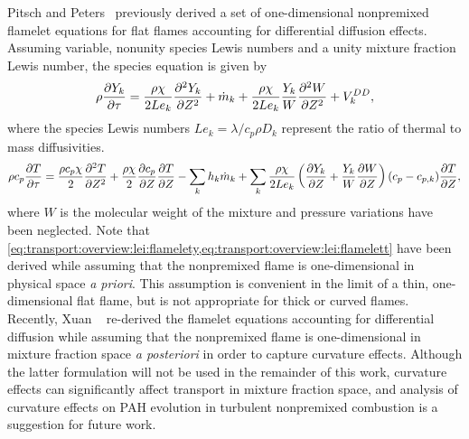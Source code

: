 Pitsch and Peters~\cite{pitsch1998} previously derived a set of one-dimensional nonpremixed flamelet equations for flat flames accounting for differential diffusion effects. Assuming variable, nonunity species Lewis numbers and a unity mixture fraction Lewis number, the species equation is given by
\begin{equation}\label{eq:transport:overview:lei:flamelety}
  \rho\pder[Y_k]{\tau} = \frac{\rho\chi}{2 Le_k}\sder[Y_k]{Z} + \dot{m}_k + \frac{\rho\chi}{2 Le_k}\frac{Y_k}{W}\sder[W]{Z} + V_k^{DD},
\end{equation}
where the species Lewis numbers $Le_k = \lambda/c_p\rho D_k$ represent the ratio of thermal to mass diffusivities.
\begin{equation}\label{eq:transport:overview:lei:flamelett}
  \rho c_p \pder[T]{\tau} = \frac{\rho c_p \chi}{2}\sder[T]{Z} + \frac{\rho\chi}{2}\pder[c_p]{Z}\pder[T]{Z} - \sum\limits_{k} h_k\dot{m}_k + \sum\limits_{k} \frac{\rho\chi}{2 Le_k}\left( \pder[Y_k]{Z} + \frac{Y_k}{W}\pder[W]{Z} \right)(c_p - c_{p,k})\pder[T]{Z},
\end{equation}
where $W$ is the molecular weight of the mixture and pressure variations have been neglected. Note that \cref{eq:transport:overview:lei:flamelety,eq:transport:overview:lei:flamelett} have been derived while assuming that the nonpremixed flame is one-dimensional in physical space \textit{a priori}. This assumption is convenient in the limit of a thin, one-dimensional flat flame, but is not appropriate for thick or curved flames. Recently, Xuan \etal~\cite{xuan2014} re-derived the flamelet equations accounting for differential diffusion while assuming that the nonpremixed flame is one-dimensional in mixture fraction space \textit{a posteriori} in order to capture curvature effects. Although the latter formulation will not be used in the remainder of this work, curvature effects can significantly affect transport in mixture fraction space, and analysis of curvature effects on PAH evolution in turbulent nonpremixed combustion is a suggestion for future work.

